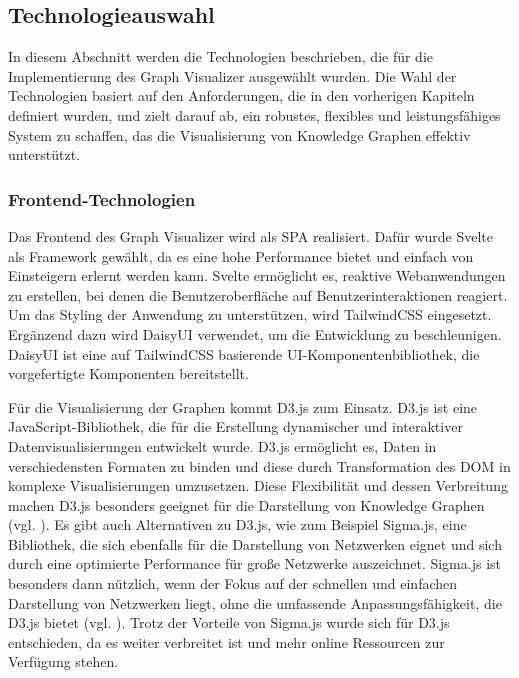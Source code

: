 \subsection{Technologieauswahl}

In diesem Abschnitt werden die Technologien beschrieben, die für die Implementierung des Graph Visualizer ausgewählt wurden. Die Wahl der Technologien basiert auf den Anforderungen, die in den vorherigen Kapiteln definiert wurden, und zielt darauf ab, ein robustes, flexibles und leistungsfähiges System zu schaffen, das die Visualisierung von Knowledge Graphen effektiv unterstützt.

\subsubsection{Frontend-Technologien}

Das Frontend des Graph Visualizer wird als \ac{SPA} realisiert. Dafür wurde Svelte als Framework gewählt, da es eine hohe Performance bietet und einfach von Einsteigern erlernt werden kann. Svelte ermöglicht es, reaktive Webanwendungen zu erstellen, bei denen die Benutzeroberfläche auf Benutzerinteraktionen reagiert. Um das Styling der Anwendung zu unterstützen, wird TailwindCSS eingesetzt. Ergänzend dazu wird DaisyUI verwendet, um die Entwicklung zu beschleunigen. DaisyUI ist eine auf TailwindCSS basierende UI-Komponentenbibliothek, die vorgefertigte Komponenten bereitstellt.

Für die Visualisierung der Graphen kommt D3.js zum Einsatz. D3.js ist eine JavaScript-Bibliothek, die für die Erstellung dynamischer und interaktiver Datenvisualisierungen entwickelt wurde. D3.js ermöglicht es, Daten in verschiedensten Formaten zu binden und diese durch Transformation des \ac{DOM} in komplexe Visualisierungen umzusetzen. Diese Flexibilität und dessen Verbreitung machen D3.js besonders geeignet für die Darstellung von Knowledge Graphen (vgl. \cite{d3js:Bostock}). Es gibt auch Alternativen zu D3.js, wie zum Beispiel Sigma.js, eine Bibliothek, die sich ebenfalls für die Darstellung von Netzwerken eignet und sich durch eine optimierte Performance für große Netzwerke auszeichnet. Sigma.js ist besonders dann nützlich, wenn der Fokus auf der schnellen und einfachen Darstellung von Netzwerken liegt, ohne die umfassende Anpassungsfähigkeit, die D3.js bietet (vgl. \cite{sigmajs:Jacomy}). Trotz der Vorteile von Sigma.js wurde sich für D3.js entschieden, da es weiter verbreitet ist und mehr online Ressourcen zur Verfügung stehen.


